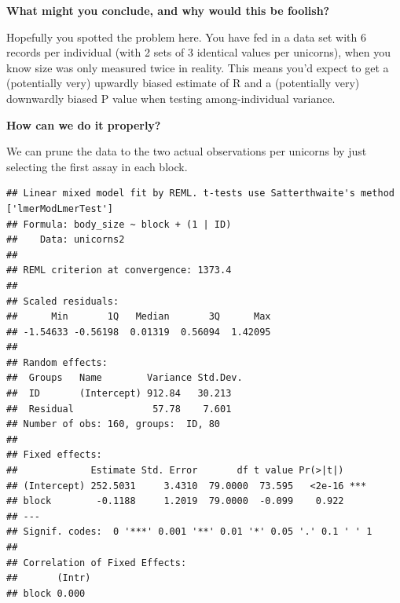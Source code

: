 \documentclass[
  12pt,
]{book}
\makeatletter
\newenvironment{Shaded}{\begin{snugshade}}{\end{snugshade}}
\newcommand{\AttributeTok}[1]{\textcolor[rgb]{0.77,0.63,0.00}{#1}}
\newcommand{\DecValTok}[1]{\textcolor[rgb]{0.00,0.00,0.81}{#1}}
\newcommand{\FunctionTok}[1]{\textcolor[rgb]{0.00,0.00,0.00}{#1}}
\newcommand{\NormalTok}[1]{#1}
\newcommand{\OtherTok}[1]{\textcolor[rgb]{0.56,0.35,0.01}{#1}}
\newcommand{\SpecialCharTok}[1]{\textcolor[rgb]{0.00,0.00,0.00}{#1}}
\newenvironment{kframe}{%
\medskip{}
\setlength{\fboxsep}{.8em}
\def\at@end@of@kframe{}%
\ifinner\ifhmode%
 \def\at@end@of@kframe{\end{minipage}}%
 \begin{minipage}{\columnwidth}%
\fi\fi%
\def\FrameCommand##1{\hskip\@totalleftmargin \hskip-\fboxsep
\colorbox{incolor}{##1}\hskip-\fboxsep
    \hskip-\linewidth \hskip-\@totalleftmargin \hskip\columnwidth}%
\MakeFramed {\advance\hsize-\width
  \@totalleftmargin\z@ \linewidth\hsize
  \@setminipage}}%
{\par\unskip\endMakeFramed%
\at@end@of@kframe}
\newenvironment{rmdblock}[1]
 {
 \begin{itemize}
 \renewcommand{\labelitemi}{
   \raisebox{-.7\height}[0pt][0pt]{
     {\setkeys{Gin}{width=3em,keepaspectratio}\texttt{[image: images/icons/\#1]}}
   }
 }
 \begin{kframe}
 \setlength{\fboxsep}{1em}
 \item
 }
 {
 \end{kframe}
 \end{itemize}
 }
\newenvironment{rmdcode}
  {\begin{rmdblock}{code}}
  {\end{rmdblock}}
\makeatother
\begin{document}
\begin{rmdcode}
\textbf{What might you conclude, and why would this be foolish?}
\end{rmdcode}

Hopefully you spotted the problem here. You have fed in a data set with 6 records per individual (with 2 sets of 3 identical values per unicorns), when you know size was only measured twice in reality. This means you'd expect to get a (potentially very) upwardly biased estimate of R and a (potentially very) downwardly biased P value when testing among-individual variance.

\begin{rmdcode}
\textbf{How can we do it properly?}
\end{rmdcode}

We can prune the data to the two actual observations per unicorns by just selecting the first assay in each block.

\begin{Shaded}
\end{Shaded}

\begin{verbatim}
## Linear mixed model fit by REML. t-tests use Satterthwaite's method ['lmerModLmerTest']
## Formula: body_size ~ block + (1 | ID)
##    Data: unicorns2
## 
## REML criterion at convergence: 1373.4
## 
## Scaled residuals: 
##      Min       1Q   Median       3Q      Max 
## -1.54633 -0.56198  0.01319  0.56094  1.42095 
## 
## Random effects:
##  Groups   Name        Variance Std.Dev.
##  ID       (Intercept) 912.84   30.213  
##  Residual              57.78    7.601  
## Number of obs: 160, groups:  ID, 80
## 
## Fixed effects:
##             Estimate Std. Error       df t value Pr(>|t|)    
## (Intercept) 252.5031     3.4310  79.0000  73.595   <2e-16 ***
## block        -0.1188     1.2019  79.0000  -0.099    0.922    
## ---
## Signif. codes:  0 '***' 0.001 '**' 0.01 '*' 0.05 '.' 0.1 ' ' 1
## 
## Correlation of Fixed Effects:
##       (Intr)
## block 0.000
\end{verbatim}
\end{document}
